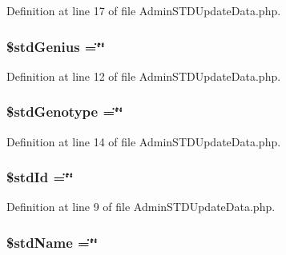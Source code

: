 Definition at line 17 of file Admin\-S\-T\-D\-Update\-Data.\-php.

\hypertarget{_admin_s_t_d_update_data_8php_a8964a2785066a92d7c0b11ff5a0261ea}{
\subsubsection[{\$std\-Genius}]{\setlength{\rightskip}{0pt plus 5cm}\$std\-Genius =\char`\"{}\char`\"{}}}\label{_admin_s_t_d_update_data_8php_a8964a2785066a92d7c0b11ff5a0261ea}


Definition at line 12 of file Admin\-S\-T\-D\-Update\-Data.\-php.

\hypertarget{_admin_s_t_d_update_data_8php_a26327dd0b8e0254d4910cf94160bb302}{
\subsubsection[{\$std\-Genotype}]{\setlength{\rightskip}{0pt plus 5cm}\$std\-Genotype =\char`\"{}\char`\"{}}}\label{_admin_s_t_d_update_data_8php_a26327dd0b8e0254d4910cf94160bb302}


Definition at line 14 of file Admin\-S\-T\-D\-Update\-Data.\-php.

\hypertarget{_admin_s_t_d_update_data_8php_a35ce457f656c7fe2bf96a6813364da40}{
\subsubsection[{\$std\-Id}]{\setlength{\rightskip}{0pt plus 5cm}\$std\-Id =\char`\"{}\char`\"{}}}\label{_admin_s_t_d_update_data_8php_a35ce457f656c7fe2bf96a6813364da40}


Definition at line 9 of file Admin\-S\-T\-D\-Update\-Data.\-php.

\hypertarget{_admin_s_t_d_update_data_8php_a04bd6b914feb54eeeb053d3f690fea50}{
\subsubsection[{\$std\-Name}]{\setlength{\rightskip}{0pt plus 5cm}\$std\-Name =\char`\"{}\char`\"{}}}\label{_admin_s_t_d_update_data_8php_a04bd6b914feb54eeeb053d3f690fea50}


